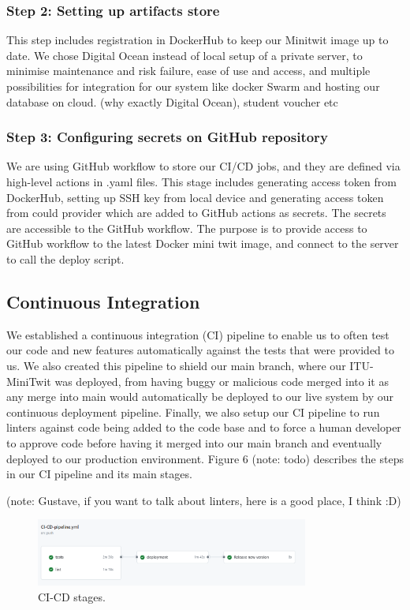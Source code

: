 \documentclass{article}
\begin{document}
\subsubsection{Step 2: Setting up artifacts store}
This step includes registration in DockerHub to keep our Minitwit image up to date. We chose Digital Ocean instead of local setup of a private server, to minimise maintenance and risk failure, ease of use and access, and multiple possibilities for integration for our system like docker Swarm and hosting our database on cloud. (why exactly Digital Ocean), student voucher etc

\subsubsection{Step 3: Configuring secrets on GitHub repository}
We are using GitHub workflow to store our CI/CD jobs, and they are defined via high-level actions in .yaml files. This stage includes generating access token from DockerHub, setting up SSH key from local device and generating access token from could provider which are added to GitHub actions as secrets. The secrets are accessible to the GitHub workflow. The purpose is to provide access to GitHub workflow to the latest Docker mini twit image, and connect to the server to call the deploy script.

\subsection{Continuous Integration}
We established a continuous integration (CI) pipeline to enable us to often test our code and new features automatically against the tests that were provided to us. We also created this pipeline to shield our main branch, where our ITU-MiniTwit was deployed, from having buggy or malicious code merged into it as any merge into main would automatically be deployed to our live system by our continuous deployment pipeline. Finally, we also setup our CI pipeline to run linters against code being added to the code base and to force a human developer to approve code before having it merged into our main branch and eventually deployed to our production environment. Figure 6 (note: todo) describes the steps in our CI pipeline and its main stages.

(note: Gustave, if you want to talk about linters, here is a good place, I think :D)

\begin{figure}[ht]
    \centering
    \includegraphics[width=0.8\textwidth]{./images/CI-CD_stages.png}
    \caption{CI-CD stages.}
    \label{fig:CI-CD stages}
\end{figure}
\end{document}
